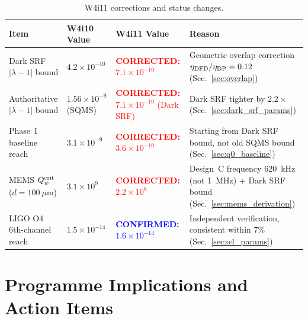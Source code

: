 \documentclass[11pt]{article}
\newcommand{\lbone}{|\lambda - 1|}
\newcommand{\Qpsi}{Q_\psi}
\newcommand{\ee}[1]{\times 10^{#1}}
\newcommand{\confirmed}[1]{\textcolor{blue}{\textbf{CONFIRMED:} #1}}
\newcommand{\corrected}[1]{\textcolor{red}{\textbf{CORRECTED:} #1}}
\theoremstyle{definition}
\theoremstyle{remark}
\begin{document}
\begin{table}[H]
\centering
\caption{W4i11 corrections and status changes.}
\label{tab:corrections}
\renewcommand{\arraystretch}{1.3}
\begin{tabular}{@{}p{4cm}p{3cm}p{3cm}p{3.5cm}@{}}
\toprule
\textbf{Item} & \textbf{W4i10 Value} & \textbf{W4i11 Value} &
\textbf{Reason} \\
\midrule
Dark SRF $\lbone$ bound &
  $4.2\ee{-10}$ &
  \corrected{$7.1\ee{-10}$} &
  Geometric overlap correction $\eta_{\rm DFD}/\eta_{\rm DP} = 0.12$
  (Sec.~\ref{sec:overlap}) \\
\midrule
Authoritative $\lbone$ bound &
  $1.56\ee{-9}$ (SQMS) &
  \corrected{$7.1\ee{-10}$ (Dark SRF)} &
  Dark SRF tighter by $2.2\times$
  (Sec.~\ref{sec:dark_srf_params}) \\
\midrule
Phase~I baseline reach &
  $3.1\ee{-9}$ &
  \corrected{$3.6\ee{-10}$} &
  Starting from Dark SRF bound, not old SQMS bound
  (Sec.~\ref{sec:q0_baseline}) \\
\midrule
MEMS $\Qpsi^{\rm crit}$ ($d = 100~\mu$m) &
  $3.1\ee{9}$ &
  \corrected{$2.2\ee{8}$} &
  Design~C frequency 620~kHz (not 1~MHz) + Dark SRF bound
  (Sec.~\ref{sec:mems_derivation}) \\
\midrule
LIGO O4 6th-channel reach &
  $1.5\ee{-14}$ &
  \confirmed{$1.6\ee{-14}$} &
  Independent verification, consistent within 7\%
  (Sec.~\ref{sec:o4_params}) \\
\bottomrule
\end{tabular}
\end{table}


\section{Programme Implications and Action Items}
\label{sec:actions}
\end{document}
